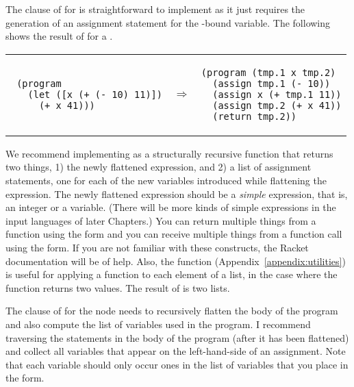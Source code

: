 \documentclass[11pt]{book}
\begin{document}
The clause of  for  is straightforward to
implement as it just requires the generation of an assignment
statement for the -bound variable. The following shows the
result of  for a . \\
\begin{tabular}{lll}
\begin{minipage}{0.4\textwidth}
\begin{lstlisting}
 (program
   (let ([x (+ (- 10) 11)])
     (+ x 41)))
\end{lstlisting}
\end{minipage}
&
$\Rightarrow$
&
\begin{minipage}{0.4\textwidth}
\begin{lstlisting}
(program (tmp.1 x tmp.2)
  (assign tmp.1 (- 10))
  (assign x (+ tmp.1 11))
  (assign tmp.2 (+ x 41))
  (return tmp.2))
\end{lstlisting}
\end{minipage}
\end{tabular}

We recommend implementing  as a structurally recursive
function that returns two things, 1) the newly flattened expression,
and 2) a list of assignment statements, one for each of the new
variables introduced while flattening the expression.  The newly
flattened expression should be a \emph{simple} expression, that is, an
integer or a variable. (There will be more kinds of simple expressions
in the input languages of later Chapters.) You can return multiple
things from a function using the  form and you can receive
multiple things from a function call using the 
form. If you are not familiar with these constructs, the Racket
documentation will be of help. Also, the  function
(Appendix~\ref{appendix:utilities}) is useful for applying a function
to each element of a list, in the case where the function returns two
values. The result of  is two lists.

The clause of  for the  node needs to
recursively flatten the body of the program and also compute the list
of variables used in the program.  I recommend traversing the
statements in the body of the program (after it has been flattened)
and collect all variables that appear on the left-hand-side of an
assignment. Note that each variable should only occur ones in the list
of variables that you place in the  form.
\end{document}
